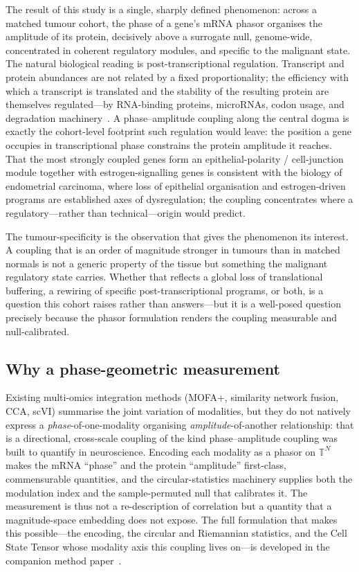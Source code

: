 \documentclass[preprint,12pt,amsmath,amssymb,superscriptaddress,floatfix]{revtex4-2}
\newcommand{\torus}{\mathbb{T}}
\begin{document}
The result of this study is a single, sharply defined phenomenon: across a
matched tumour cohort, the phase of a gene's mRNA phasor organises the amplitude
of its protein, decisively above a surrogate null, genome-wide, concentrated in
coherent regulatory modules, and specific to the malignant state. The natural
biological reading is post-transcriptional regulation. Transcript and protein
abundances are not related by a fixed proportionality; the efficiency with which
a transcript is translated and the stability of the resulting protein are
themselves regulated---by RNA-binding proteins, microRNAs, codon usage, and
degradation machinery~\citep{srivastava2022}. A phase--amplitude coupling along
the central dogma is exactly the cohort-level footprint such regulation would
leave: the position a gene occupies in transcriptional phase constrains the
protein amplitude it reaches. That the most strongly coupled genes form an
epithelial-polarity / cell-junction module together with estrogen-signalling
genes is consistent with the biology of endometrial carcinoma, where loss of
epithelial organisation and estrogen-driven programs are established axes of
dysregulation; the coupling concentrates where a regulatory---rather than
technical---origin would predict.

The tumour-specificity is the observation that gives the phenomenon its interest.
A coupling that is an order of magnitude stronger in tumours than in matched
normals is not a generic property of the tissue but something the malignant
regulatory state carries. Whether that reflects a global loss of translational
buffering, a rewiring of specific post-transcriptional programs, or both, is a
question this cohort raises rather than answers---but it is a well-posed question
precisely because the phasor formulation renders the coupling measurable and
null-calibrated.

\subsection{Why a phase-geometric measurement}

Existing multi-omics integration methods (MOFA+, similarity network fusion, CCA,
scVI) summarise the joint variation of modalities, but they do not natively
express a \emph{phase}-of-one-modality organising \emph{amplitude}-of-another
relationship: that is a directional, cross-scale coupling of the kind
phase--amplitude coupling was built to quantify in neuroscience. Encoding each
modality as a phasor on $\torus^N$ makes the mRNA ``phase'' and the protein
``amplitude'' first-class, commensurable quantities, and the circular-statistics
machinery supplies both the modulation index and the sample-permuted null that
calibrates it. The measurement is thus not a re-description of correlation but a
quantity that a magnitude-space embedding does not expose. The full formulation
that makes this possible---the encoding, the circular and Riemannian statistics,
and the Cell State Tensor whose modality axis this coupling lives on---is
developed in the companion method paper~\cite{biophasor_platform}.
\end{document}
